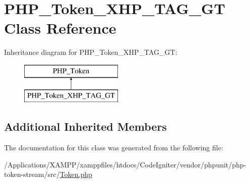 \hypertarget{class_p_h_p___token___x_h_p___t_a_g___g_t}{}\section{P\+H\+P\+\_\+\+Token\+\_\+\+X\+H\+P\+\_\+\+T\+A\+G\+\_\+\+GT Class Reference}
\label{class_p_h_p___token___x_h_p___t_a_g___g_t}
Inheritance diagram for P\+H\+P\+\_\+\+Token\+\_\+\+X\+H\+P\+\_\+\+T\+A\+G\+\_\+\+GT\+:\begin{figure}[H]
\begin{center}
\leavevmode
\includegraphics[height=2.000000cm]{class_p_h_p___token___x_h_p___t_a_g___g_t}
\end{center}
\end{figure}
\subsection*{Additional Inherited Members}


The documentation for this class was generated from the following file\+:\begin{DoxyCompactItemize}
\item 
/\+Applications/\+X\+A\+M\+P\+P/xamppfiles/htdocs/\+Code\+Igniter/vendor/phpunit/php-\/token-\/stream/src/\mbox{\hyperlink{_token_8php}{Token.\+php}}\end{DoxyCompactItemize}
